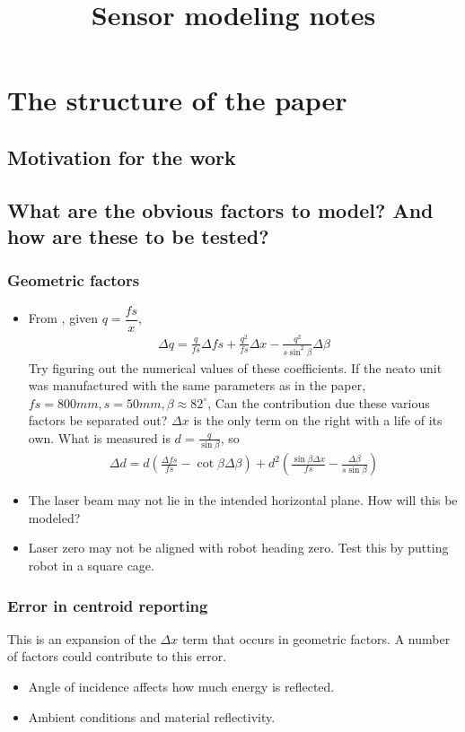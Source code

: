 \documentclass[a4paper, 11pt]{article}
\author{}
\title{Sensor modeling notes}
\date{}
\begin{document}
\maketitle

\section{The structure of the paper}
\subsection{Motivation for the work}

\subsection{What are the obvious factors to model? And how are these to be tested?}
\subsubsection*{Geometric factors}
\begin{itemize}
\item
From \cite{neato_sensor}, given $q = \dfrac{fs}{x}$,
  \begin{align*}
    \Delta q = \frac{q}{fs}\Delta fs + \frac{q^2}{fs}\Delta x - \frac{q^2}{s\sin^2 \beta}\Delta \beta
  \end{align*}
Try figuring out the numerical values of these coefficients. If the neato unit was manufactured with the same parameters as in the paper, $fs = 800mm, s = 50mm, \beta \approx 82^\circ$, Can the contribution due these various factors be separated out? $\Delta x$ is the only term on the right with a life of its own. What is measured is $d = \frac{q}{\sin \beta}$, so
  \begin{align*}
    \Delta d = d\left(\frac{\Delta fs}{fs} - \cot \beta\Delta \beta\right) + d^2\left(\frac{\sin \beta\Delta x}{fs} - \frac{\Delta \beta}{s\sin \beta}\right)
  \end{align*}
\item The laser beam may not lie in the intended horizontal plane. How will this be modeled?
\item Laser zero may not be aligned with robot heading zero. Test this by putting robot in a square cage.
\end{itemize}

\subsubsection*{Error in centroid reporting}
This is an expansion of the $\Delta x$ term that occurs in geometric factors. A number of factors could contribute to this error. 
\begin{itemize}
\item Angle of incidence affects how much energy is reflected.
\item Ambient conditions and material reflectivity.
\end{itemize}
\end{document}
